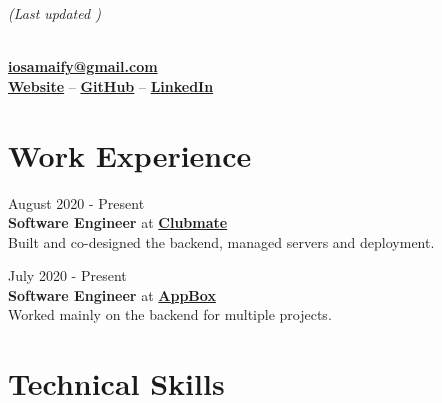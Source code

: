 \documentclass[letterpaper, 10pt]{article}
\author{Osama Muhammad}
\date{\today}
\makeatletter
\renewcommand{\maketitle}{
	\hfill{\small\textit{(Last updated \thedate)}}
	\vspace{1em}
	\begin{center}
		\par{\huge\bfseries{\theauthor}}
		\vspace{0.7em}\\
		\href{mailto:iosamaify@gmail.com}{\textbf{iosamaify@gmail.com}}
		\vspace{0.7em}\\
		\href{https://osamai.github.io}{\textbf{Website}} --
		\href{https://github.com/osamai}{\textbf{GitHub}} --
		\href{https://www.linkedin.com/in/iosama}{\textbf{LinkedIn}}
	\end{center}
}
\newcommand{\hr}{\par{\vspace{-.3\ht\strutbox}\noindent\hrulefill\par}}
\makeatother
\begin{document}
\maketitle

\hr

\section{Work Experience}

\hfill{\footnotesize{August 2020 - Present}}\\
\textbf{Software Engineer} at \href{https://www.clubmate-sports.co.uk}{\textbf{Clubmate}}\\
\vspace{1em}
Built and co-designed the backend, managed servers and deployment.
\vspace{0.3cm}

\hfill{\footnotesize{July 2020 - Present}}\\
\textbf{Software Engineer} at \href{https://www.app-box.co.uk}{\textbf{AppBox}}\\
\vspace{1em}
Worked mainly on the backend for multiple projects.
\vspace{0.3cm}

\vspace{0.3cm}
\hr

\section{Technical Skills}
\end{document}
